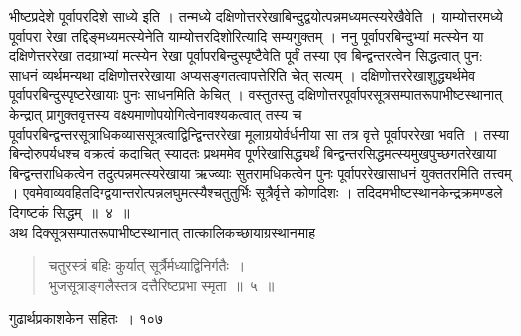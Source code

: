 \documentclass[11pt, openany]{book}
\begin{document}
\begin{sloppypar}
\noindent भीष्टप्रदेशे पूर्वापरदिशे साध्ये इति । तन्मध्ये दक्षिणोत्तररेखाबिन्दुद्वयोत्पन्नमध्यमत्स्यरेखैवेति । याम्योत्तरमध्ये पूर्वापरा रेखा  तद्दिङ्मध्यमत्स्येनेति याम्योत्तरदिशोरित्यादि सम्यगुक्तम् । ननु पूर्वापरबिन्दुभ्यां मत्स्येन या दक्षिणेत्तररेखा तदग्राभ्यां मत्स्येन रेखा पूर्वापरबिन्दुस्पृष्टैवेति पूर्वं तस्या एव बिन्द्वन्तरत्वेन सिद्धत्वात् पुन: साधनं व्यर्थमन्यथा दक्षिणोत्तररेखाया अप्यसङ्गतत्वापत्तेरिति चेत् सत्यम् । दक्षिणोत्तररेखाशुद्ध्यर्थमेव पूर्वापरबिन्दुस्पृष्टरेखायाः पुनः साधनमिति केचित् । वस्तुतस्तु दक्षिणोत्तरपूर्वापरसूत्रसम्पातरूपाभीष्टस्थानात् केन्द्रात् प्रागुक्तवृत्तस्य वक्ष्यमाणोपयोगित्वेनावश्यकत्वात् तस्य च पूर्वापरबिन्द्वन्तरसूत्राधिकव्याससूत्रत्वाद्विन्द्विन्तररेखा मूलाग्रयोर्वर्धनीया सा तत्र वृत्ते पूर्वापररेखा भवति । तस्या बिन्दोरुपर्यधश्च वक्रत्वं कदाचित् स्यादतः प्रथममेव पूर्णरेखासिद्ध्यर्थं बिन्द्वन्तरसिद्धमत्स्यमुखपुच्छगतरेखाया बिन्द्वन्तराधिकत्वेन तदुत्पन्नमत्स्यरेखाया ऋज्व्याः सुतरामधिकत्वेन पुनः पूर्वापररेखासाधनं युक्ततरमिति तत्त्वम् । एवमेवाव्यवहितदिग्द्वयान्तरोत्पन्नलघुमत्स्यैश्चतुतुर्भिः सूत्रैर्वृत्ते कोणदिशः । तदिदमभीष्टस्थानकेन्द्रक्रमण्डले दिगष्टकं सिद्धम्~॥~४~॥\\
\noindent अथ दिक्सूत्रसम्पातरूपाभीष्टस्थानात् तात्कालिकच्छायाग्रस्थानमाह\textendash
\end{sloppypar}

\begin{quote}

  {\ssi चतुरस्त्रं बहिः कुर्यात् सूर्त्रैर्मध्याद्विनिर्गतैः~।\\
 भुजसूत्राङ्गलैस्तत्र दत्तैरिष्टप्रभा स्मृता~॥~५~॥}
\end{quote}
\newpage




\hspace{3cm} गुढार्थप्रकाशकेन सहितः~। \hfill १०७
\vspace{1cm}
\end{document}

